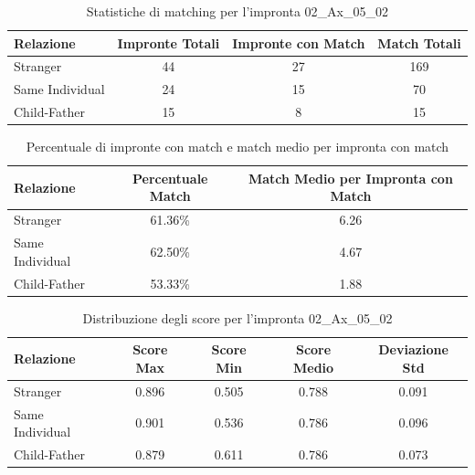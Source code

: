 \begin{table}[htbp]
\centering
\caption{Statistiche di matching per l'impronta 02\_Ax\_05\_02}
\label{tab:results_02_Ax_05_02}
\begin{tabular}{|l|c|c|c|}
\hline
\textbf{Relazione} & \textbf{Impronte Totali} & \textbf{Impronte con Match} & \textbf{Match Totali} \\
\hline
Stranger & 44 & 27 & 169 \\
\hline
Same Individual & 24 & 15 & 70 \\
\hline
Child-Father & 15 & 8 & 15 \\
\hline
\end{tabular}
\end{table}


\begin{table}[htbp]
\centering
\caption{Percentuale di impronte con match e match medio per impronta con match}
\label{tab:match_percentage_02_Ax_05_02}
\begin{tabular}{|l|c|c|}
\hline
\textbf{Relazione} & \textbf{Percentuale Match} & \textbf{Match Medio per Impronta con Match} \\
\hline
Stranger & 61.36\% & 6.26 \\
\hline
Same Individual & 62.50\% & 4.67 \\
\hline
Child-Father & 53.33\% & 1.88 \\
\hline
\end{tabular}
\end{table}


\begin{table}[htbp]
\centering
\caption{Distribuzione degli score per l'impronta 02\_Ax\_05\_02}
\label{tab:scores_02_Ax_05_02}
\begin{tabular}{|l|c|c|c|c|}
\hline
\textbf{Relazione} & \textbf{Score Max} & \textbf{Score Min} & \textbf{Score Medio} & \textbf{Deviazione Std} \\
\hline
Stranger & 0.896 & 0.505 & 0.788 & 0.091 \\
\hline
Same Individual & 0.901 & 0.536 & 0.786 & 0.096 \\
\hline
Child-Father & 0.879 & 0.611 & 0.786 & 0.073 \\
\hline
\end{tabular}
\end{table}

